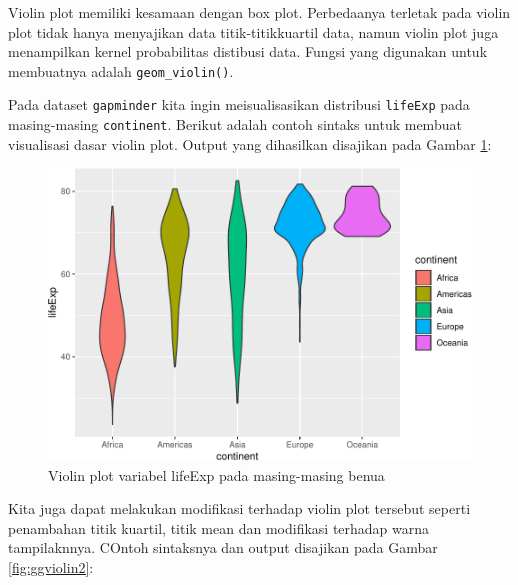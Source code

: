 \documentclass[]{book}
\newenvironment{Shaded}{\begin{snugshade}}{\end{snugshade}}
\newcommand{\KeywordTok}[1]{\textcolor[rgb]{0.13,0.29,0.53}{\textbf{#1}}}
\newcommand{\DataTypeTok}[1]{\textcolor[rgb]{0.13,0.29,0.53}{#1}}
\newcommand{\StringTok}[1]{\textcolor[rgb]{0.31,0.60,0.02}{#1}}
\newcommand{\CommentTok}[1]{\textcolor[rgb]{0.56,0.35,0.01}{\textit{#1}}}
\newcommand{\OperatorTok}[1]{\textcolor[rgb]{0.81,0.36,0.00}{\textbf{#1}}}
\newcommand{\NormalTok}[1]{#1}
\begin{document}
Violin plot memiliki kesamaan dengan box plot. Perbedaanya terletak pada
violin plot tidak hanya menyajikan data titik-titikkuartil data, namun
violin plot juga menampilkan kernel probabilitas distibusi data. Fungsi
yang digunakan untuk membuatnya adalah \texttt{geom\_violin()}.

Pada dataset \texttt{gapminder} kita ingin meisualisasikan distribusi
\texttt{lifeExp} pada masing-masing \texttt{continent}. Berikut adalah
contoh sintaks untuk membuat visualisasi dasar violin plot. Output yang
dihasilkan disajikan pada Gambar \ref{fig:ggviolin}:

\begin{Shaded}
\end{Shaded}

\begin{figure}

{\centering \includegraphics[width=0.7\linewidth]{EnvStat_files/figure-latex/ggviolin-1} 

}

\caption{Violin plot variabel lifeExp pada masing-masing benua}\label{fig:ggviolin}
\end{figure}

Kita juga dapat melakukan modifikasi terhadap violin plot tersebut
seperti penambahan titik kuartil, titik mean dan modifikasi terhadap
warna tampilaknnya. COntoh sintaksnya dan output disajikan pada Gambar
\ref{fig:ggviolin2}:
\end{document}
